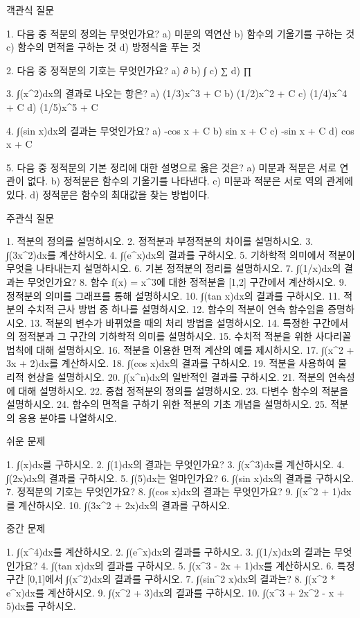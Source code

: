 \documentclass[fleqn]{article}
\begin{document}
      
         객관식 질문

1. 다음 중 적분의 정의는 무엇인가요?
   a) 미분의 역연산  
   b) 함수의 기울기를 구하는 것  
   c) 함수의 면적을 구하는 것  
   d) 방정식을 푸는 것  

2. 다음 중 정적분의 기호는 무엇인가요?
   a) ∂  
   b) ∫  
   c) ∑  
   d) ∏  

3. ∫(x^2)dx의 결과로 나오는 항은?
   a) (1/3)x^3 + C  
   b) (1/2)x^2 + C  
   c) (1/4)x^4 + C  
   d) (1/5)x^5 + C  

4. ∫(sin x)dx의 결과는 무엇인가요?
   a) -cos x + C  
   b) sin x + C  
   c) -sin x + C  
   d) cos x + C  

5. 다음 중 정적분의 기본 정리에 대한 설명으로 옳은 것은?
   a) 미분과 적분은 서로 연관이 없다.  
   b) 정적분은 함수의 기울기를 나타낸다.  
   c) 미분과 적분은 서로 역의 관계에 있다.  
   d) 정적분은 함수의 최대값을 찾는 방법이다.  

 주관식 질문

1. 적분의 정의를 설명하시오.
2. 정적분과 부정적분의 차이를 설명하시오.
3. ∫(3x^2)dx를 계산하시오.
4. ∫(e^x)dx의 결과를 구하시오.
5. 기하학적 의미에서 적분이 무엇을 나타내는지 설명하시오.
6. 기본 정적분의 정리를 설명하시오.
7. ∫(1/x)dx의 결과는 무엇인가요?
8. 함수 f(x) = x^3에 대한 정적분을 [1,2] 구간에서 계산하시오.
9. 정적분의 의미를 그래프를 통해 설명하시오.
10. ∫(tan x)dx의 결과를 구하시오.
11. 적분의 수치적 근사 방법 중 하나를 설명하시오.
12. 함수의 적분이 연속 함수임을 증명하시오.
13. 적분의 변수가 바뀌었을 때의 처리 방법을 설명하시오.
14. 특정한 구간에서의 정적분과 그 구간의 기하학적 의미를 설명하시오.
15. 수치적 적분을 위한 사다리꼴 법칙에 대해 설명하시오.
16. 적분을 이용한 면적 계산의 예를 제시하시오.
17. ∫(x^2 + 3x + 2)dx를 계산하시오.
18. ∫(cos x)dx의 결과를 구하시오.
19. 적분을 사용하여 물리적 현상을 설명하시오.
20. ∫(x^n)dx의 일반적인 결과를 구하시오.
21. 적분의 연속성에 대해 설명하시오.
22. 중첩 정적분의 정의를 설명하시오.
23. 다변수 함수의 적분을 설명하시오.
24. 함수의 면적을 구하기 위한 적분의 기초 개념을 설명하시오.
25. 적분의 응용 분야를 나열하시오.

 쉬운 문제

1. ∫(x)dx를 구하시오.
2. ∫(1)dx의 결과는 무엇인가요?
3. ∫(x^3)dx를 계산하시오.
4. ∫(2x)dx의 결과를 구하시오.
5. ∫(5)dx는 얼마인가요?
6. ∫(sin x)dx의 결과를 구하시오.
7. 정적분의 기호는 무엇인가요?
8. ∫(cos x)dx의 결과는 무엇인가요?
9. ∫(x^2 + 1)dx를 계산하시오.
10. ∫(3x^2 + 2x)dx의 결과를 구하시오.

 중간 문제

1. ∫(x^4)dx를 계산하시오.
2. ∫(e^x)dx의 결과를 구하시오.
3. ∫(1/x)dx의 결과는 무엇인가요?
4. ∫(tan x)dx의 결과를 구하시오.
5. ∫(x^3 - 2x + 1)dx를 계산하시오.
6. 특정 구간 [0,1]에서 ∫(x^2)dx의 결과를 구하시오.
7. ∫(sin^2 x)dx의 결과는?
8. ∫(x^2 * e^x)dx를 계산하시오.
9. ∫(x^2 + 3)dx의 결과를 구하시오.
10. ∫(x^3 + 2x^2 - x + 5)dx를 구하시오.
\end{document}
